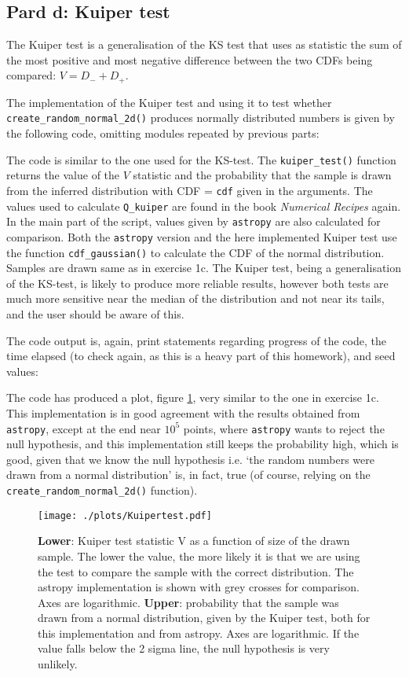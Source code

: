 \documentclass{article}
\begin{document}
\subsection{Pard d: Kuiper test}
The Kuiper test is a generalisation of the KS test that uses as statistic the sum of the most positive and most negative difference between the two CDFs being compared: $V = D_{-} + D_{+}$. 

The implementation of the Kuiper test and using it to test whether \verb+create_random_normal_2d()+ produces normally distributed numbers is given by the following code, omitting modules repeated by previous parts:


The code is similar to the one used for the KS-test. The \verb+kuiper_test()+ function returns the value of the $V$ statistic and the probability that the sample is drawn from the inferred distribution with CDF = \verb+cdf+ given in the arguments. The values used to calculate \verb+Q_kuiper+ are found in the book \textit{Numerical Recipes} again. In the main part of the script, values given by \verb+astropy+ are also calculated for comparison. Both the \verb+astropy+ version and the here implemented Kuiper test use the function \verb+cdf_gaussian()+ to calculate the CDF of the normal distribution. Samples are drawn same as in exercise 1c. The Kuiper test, being a generalisation of the KS-test, is likely to produce more reliable results, however both tests are much more sensitive near the median of the distribution and not near its tails, and the user should be aware of this. 

The code output is, again, print statements regarding progress of the code, the time elapsed (to check again, as this is a heavy part of this homework), and seed values:


The code has produced a plot, figure \ref{fig:Kuiper}, very similar to the one in exercise 1c. This implementation is in good agreement with the results obtained from \verb+astropy+, except at the end near $10^5$ points, where \verb+astropy+ wants to reject the null hypothesis, and this implementation still keeps the probability high, which is good, given that we know the null hypothesis i.e. `the random numbers were drawn from a normal distribution' is, in fact, true (of course, relying on the \verb+create_random_normal_2d()+ function). 

\begin{figure}
	\centering
	\texttt{[image: ./plots/Kuipertest.pdf]}
	\caption{\textbf{Lower}: Kuiper test statistic V as a function of size of the drawn sample. The lower the value, the more likely it is that we are using the test to compare the sample with the correct distribution. The astropy implementation is shown with grey crosses for comparison. Axes are logarithmic. \textbf{Upper}: probability that the sample was drawn from a normal distribution, given by the Kuiper test, both for this implementation and from astropy. Axes are logarithmic. If the value falls below the 2 sigma line, the null hypothesis is very unlikely.}
	\label{fig:Kuiper}
\end{figure}
\end{document}
